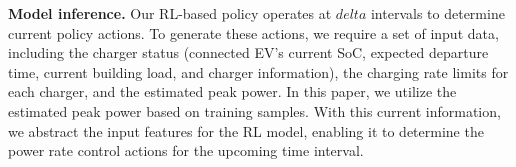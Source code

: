 {%


 

{\bf Model inference.} Our RL-based policy operates at $delta$ intervals to determine current policy actions. To generate these actions, we require a set of input data, including the charger status (connected EV's current SoC, expected departure time, current building load, and charger information), the charging rate limits for each charger, and the estimated peak power. 
In this paper, we utilize the estimated peak power based on training samples. With this current information, we abstract the input features for the RL model, enabling it to determine the power rate control actions for the upcoming time interval.
} 



